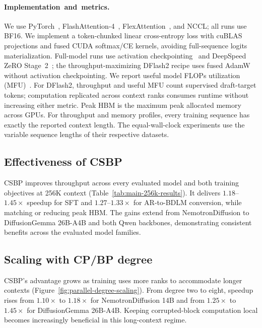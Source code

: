 \paragraph{\mbox{Implementation and metrics.}}
We use PyTorch~\citep{paszke2019pytorch},
FlashAttention-4~\citep{zadouri2026flashattention4},
FlexAttention~\citep{dong2025flexattention}, and NCCL; all runs use BF16.
We implement a token-chunked linear cross-entropy loss with cuBLAS
projections and fused CUDA softmax/CE kernels, avoiding full-sequence logits
materialization.
Full-model runs use activation checkpointing~\citep{chen2016checkpointing} and
DeepSpeed ZeRO Stage~2~\citep{rajbhandari2019zero}; the
throughput-maximizing DFlash2 recipe uses fused AdamW without activation
checkpointing. We report useful model FLOPs utilization
(MFU)~\citep{chowdhery2022palm}. For DFlash2, throughput and useful MFU count
supervised draft-target tokens; computation replicated across context ranks
consumes runtime without increasing either metric. Peak HBM is the maximum
peak allocated memory across GPUs. For throughput and memory profiles, every training sequence has
exactly the reported context length. The equal-wall-clock experiments use the
variable sequence lengths of their respective datasets.

\subsection{Effectiveness of CSBP}
\label{sec:main-256k-results}

CSBP improves throughput across every evaluated model and both training
objectives at 256K context (Table~\ref{tab:main-256k-results}). It delivers
$1.18$--$1.45\times$ speedup for SFT and $1.27$--$1.33\times$ for AR-to-BDLM conversion, while matching or reducing peak HBM. The gains extend from
NemotronDiffusion to DiffusionGemma 26B-A4B and both Qwen backbones, demonstrating consistent
benefits across the evaluated model families.



\subsection{Scaling with CP/BP degree}
\label{sec:parallel-degree-scaling}

CSBP's advantage grows as training uses more ranks to accommodate longer
contexts (Figure~\ref{fig:parallel-degree-scaling}). From degree two to eight,
speedup rises from $1.10\times$ to $1.18\times$ for NemotronDiffusion 14B and from
$1.25\times$ to $1.45\times$ for DiffusionGemma 26B-A4B.
Keeping corrupted-block computation local becomes increasingly beneficial
in this long-context regime.

